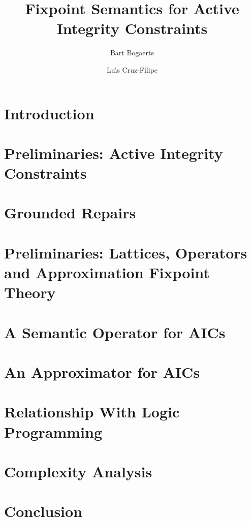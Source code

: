 \documentclass[3p,number,authoryear]{elsarticle}
\title{Fixpoint Semantics for Active Integrity Constraints} %
\author[kul]{Bart Bogaerts\corref{cor1}} \ead{bart.bogaerts@cs.kuleuven.be}
\author[sdu]{Lu\'\i s Cruz-Filipe} \ead{lcfilipe@gmail.com}
\begin{document}


\maketitle

\section{Introduction}\label{sec:intro}


\section{Preliminaries: Active Integrity Constraints}\label{sec:prelims}


\section{Grounded Repairs} \label{sec:grounded}


\section{Preliminaries: Lattices, Operators and Approximation Fixpoint Theory}\label{sec:aft}


\section{A Semantic Operator for AICs}\label{sec:operator}


\section{An Approximator for AICs}\label{sec:approximator}


\section{Relationship With Logic Programming}\label{sec:lp}


\section{Complexity Analysis}\label{sec:complexity}



\section{Conclusion}\label{sec:concl}

\end{document}
